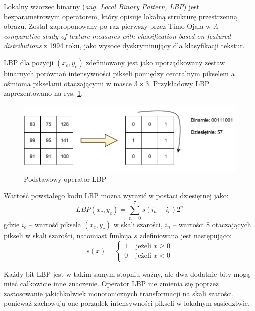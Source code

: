 Lokalny wzorzec binarny (\emph{ang. Local Binary Pattern, LBP}) jest bezparametrowym operatorem, który opisuje lokalną strukturę przestrzenną obrazu. Został zaproponowany po raz pierwszy przez Timo Ojala w \emph{A comparative study of texture measures with classification based on featured distributions}\cite{OJALA94} z 1994 roku, jako wysoce dyskryminujący dla klasyfikacji tekstur.

LBP dla pozycji $(x_c, y_c)$ zdefiniowany jest jako uporządkowany zestaw binarnych porównań intensywności pikseli pomiędzy centralnym pikselem a ośmioma pikselami otaczającymi w masce $3 \times 3$. Przykładowy LBP zaprezentowano na rys. \ref{fig:lbp-operator}.

\begin{figure}[h]
	\centering
	\includegraphics[scale=1.0]{graphics/01_podstawy_teoretyczne/lbp-operator.pdf}
	\caption{ Podstawowy operator LBP \cite{HEUSCH06} }
	\label{fig:lbp-operator}
\end{figure}

Wartość powstałego kodu LBP można wyrazić w postaci dziesiętnej jako:
\begin{equation} 
\label{lbp_lbp} 
LBP(x_c, y_c) = \sum\limits_{n = 0}^7 s(i_n - i_c) 2^n
\end{equation} gdzie $i_c$ -- wartość piksela $(x_c, y_c)$ w skali szarości, $i_n$ -- wartości 8 otaczających pikseli w skali szarości, natomiast funkcja $s$ zdefiniowana jest następująco:
\begin{equation} 
\label{lbp_s} 
s(x) = 
	\begin{cases}
		1 & \text{ jeżeli } x \geq 0 \\
		0 & \text{ jeżeli } x < 0
	\end{cases} 
\end{equation}

Każdy bit LBP jest w takim samym stopniu ważny, ale dwa dodatnie bity mogą mieć całkowicie inne znaczenie. Operator LBP nie zmienia się poprzez zastosowanie jakichkolwiek monotonicznych transformacji na skali szarości, ponieważ zachowują one porządek intensywności pikseli w lokalnym sąsiedztwie.


